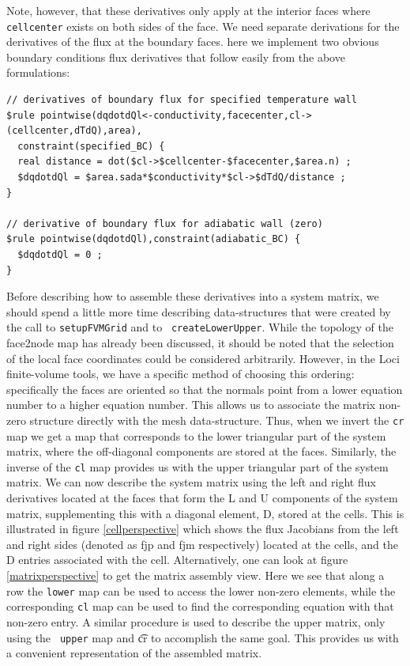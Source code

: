 \documentclass[10pt,epsf,letterpaper,twoside]{book}
\begin{document}
Note, however, that these derivatives only apply at the interior faces
where {\tt cellcenter} exists on both sides of the face.  We need
separate derivations for the derivatives of the flux at the boundary
faces.  here we implement two obvious boundary conditions flux
derivatives that follow easily from the above formulations:

\begin{verbatim}
// derivatives of boundary flux for specified temperature wall
$rule pointwise(dqdotdQl<-conductivity,facecenter,cl->(cellcenter,dTdQ),area),
  constraint(specified_BC) {
  real distance = dot($cl->$cellcenter-$facecenter,$area.n) ;
  $dqdotdQl = $area.sada*$conductivity*$cl->$dTdQ/distance ;
}

// derivative of boundary flux for adiabatic wall (zero)
$rule pointwise(dqdotdQl),constraint(adiabatic_BC) {
  $dqdotdQl = 0 ;
}
\end{verbatim}

Before describing how to assemble these derivatives into a system
matrix, we should spend a little more time describing data-structures
that were created by the call to {\tt setupFVMGrid} and to {\tt
  createLowerUpper}.  While the topology of the face2node map has
already been discussed, it should be noted that the selection of the
local face coordinates could be considered arbitrarily.  However, in
the Loci finite-volume tools, we have a specific method of choosing
this ordering: specifically the faces are oriented so that the normals
point from a lower equation number to a higher equation number.  This
allows us to associate the matrix non-zero structure directly with the
mesh data-structure.  Thus, when we invert the {\tt cr} map we get a
map that corresponds to the lower triangular part of the system
matrix, where the off-diagonal components are stored at the faces.
Similarly, the inverse of the {\tt cl} map provides us with the upper
triangular part of the system matrix.  We can now describe the system
matrix using the left and right flux derivatives located at the faces
that form the L and U components of the system matrix, supplementing
this with a diagonal element, D, stored at the cells.  This is
illustrated in figure \ref{cellperspective} which shows the flux
Jacobians from the left and right sides (denoted as fjp and fjm
respectively) located at the cells, and the D entries associated with
the cell.  Alternatively, one can look at figure
\ref{matrixperspective} to get the matrix assembly view.  Here we see
that along a row the {\tt lower} map can be used to access the lower
non-zero elements, while the corresponding {\tt cl} map can be used to
find the corresponding equation with that non-zero entry.  A similar
procedure is used to describe the upper matrix, only using the {\tt
  upper} map and {\t cr} to accomplish the same goal. This provides us
with a convenient representation of the assembled matrix.
\end{document}
